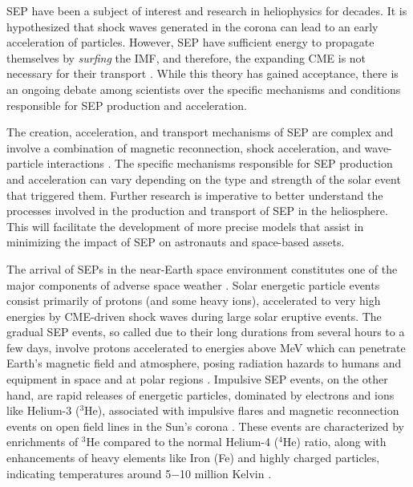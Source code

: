 SEP have been a subject of interest and research in heliophysics for decades. It is hypothesized that shock waves generated in the corona can lead to an early acceleration of particles. However, SEP have sufficient energy to propagate themselves by \textit{surfing} the IMF, and therefore, the expanding CME is not necessary for their transport \citep{reames_2000, kota_2005, kozarev_2019, kozarev_2022}. While this theory has gained acceptance, there is an ongoing debate among scientists over the specific mechanisms and conditions responsible for SEP production and acceleration.

The creation, acceleration, and transport mechanisms of SEP are complex and involve a combination of magnetic reconnection, shock acceleration, and wave-particle interactions \citep{li_2003, li_2012b, ng_2012}. The specific mechanisms responsible for SEP production and acceleration can vary depending on the type and strength of the solar event that triggered them. Further research is imperative to better understand the processes involved in the production and transport of SEP in the heliosphere. This will facilitate the development of more precise models that assist in minimizing the impact of SEP on astronauts and space-based assets.

The arrival of SEPs in the near-Earth space environment constitutes one of the major components of adverse space weather \citep{reames_1999, vainio_2009}. Solar energetic particle events consist primarily of protons (and some heavy ions), accelerated to very high energies by CME-driven shock waves during large solar eruptive events. The gradual SEP events, so called due to their long durations from several hours to a few days, involve protons accelerated to energies above  MeV which can penetrate Earth’s magnetic field and atmosphere, posing radiation hazards to humans and equipment in space and at polar regions \citep{reames_2013}.
Impulsive SEP events, on the other hand, are rapid releases of energetic particles, dominated by electrons and ions like Helium-3 ($^3$He), associated with impulsive flares and magnetic reconnection events on open field lines in the Sun's corona \citep{nitta_2015}. These events are characterized by enrichments of $^3$He compared to the normal Helium-4 ($^4$He) ratio, along with enhancements of heavy elements like Iron (Fe) and highly charged particles, indicating temperatures around 5$-$10 million Kelvin \citep{reames_2021}.

